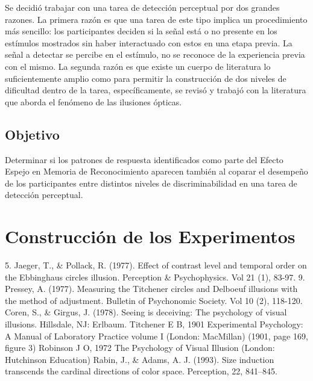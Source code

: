 Se decidió trabajar con una tarea de detección perceptual por dos grandes razones. La primera razón es que una tarea de este tipo implica un procedimiento más sencillo: los participantes deciden si la señal está o no presente en los estímulos mostrados sin haber interactuado con estos en una etapa previa. La señal a detectar se percibe en el estímulo, no se reconoce de la experiencia previa con el mismo. La segunda razón es que existe un cuerpo de literatura lo suficientemente amplio como para permitir la construcción de dos niveles de dificultad dentro de la tarea, específicamente, se revisó y trabajó con la literatura que aborda el fenómeno de las ilusiones ópticas.\\

\subsection{Objetivo}

Determinar si los patrones de respuesta identificados como parte del Efecto Espejo en Memoria de Reconocimiento aparecen también al coparar el desempeño de los participantes entre distintos niveles de discriminabilidad en una tarea de detección perceptual.\\

\section{Construcción de los Experimentos}

5.	Jaeger, T., & Pollack, R. (1977). Effect of contrast level and temporal order on the Ebbinghaus circles illusion. Perception & Psychophysics. Vol 21 (1), 83-97.
9.	Pressey, A. (1977). Measuring the Titchener circles and Delboeuf illusions with the method of adjustment. Bulletin of Psychonomic Society. Vol 10 (2), 118-120.
Coren, S., & Girgus, J. (1978). Seeing is deceiving: The psychology of visual illusions. Hillsdale, NJ: Erlbaum.
Titchener E B, 1901 Experimental Psychology: A Manual of Laboratory Practice volume I (London: MacMillan) (1901, page 169, figure 3)
Robinson J O, 1972 The Psychology of Visual Illusion (London: Hutchinson Education)
Rabin, J., & Adams, A. J. (1993). Size induction transcends the cardinal directions of color space. Perception, 22, 841–845.

